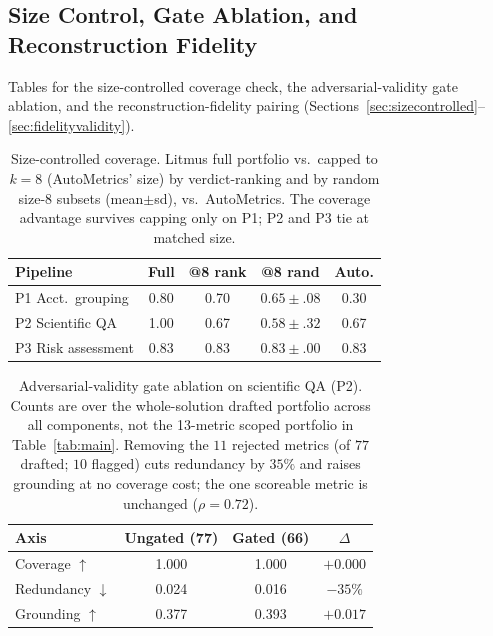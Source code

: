 \documentclass[11pt]{article}
\begin{document}
\subsection{Size Control, Gate Ablation, and Reconstruction Fidelity}
\label{app:robustness-tables}

Tables for the size-controlled coverage check, the adversarial-validity gate ablation, and the reconstruction-fidelity pairing (Sections~\ref{sec:sizecontrolled}--\ref{sec:fidelityvalidity}).

\begin{table}[t]
\centering
\small
\setlength{\tabcolsep}{4pt}
\begin{tabular}{lcccc}
\toprule
Pipeline & Full & @8 rank & @8 rand & Auto. \\
\midrule
P1 Acct.\ grouping & 0.80 & 0.70 & $0.65{\pm}.08$ & 0.30 \\
P2 Scientific QA & 1.00 & 0.67 & $0.58{\pm}.32$ & 0.67 \\
P3 Risk assessment & 0.83 & 0.83 & $0.83{\pm}.00$ & 0.83 \\
\bottomrule
\end{tabular}
\caption{Size-controlled coverage. Litmus full portfolio vs.\ capped to $k{=}8$ (AutoMetrics' size) by verdict-ranking and by random size-8 subsets (mean$\pm$sd), vs.\ AutoMetrics. The coverage advantage survives capping only on P1; P2 and P3 tie at matched size.}
\label{tab:sizecontrolled}
\end{table}

\begin{table}[t]
\centering
\small
\setlength{\tabcolsep}{6pt}
\begin{tabular}{lccc}
\toprule
Axis & Ungated (77) & Gated (66) & $\Delta$ \\
\midrule
Coverage $\uparrow$ & 1.000 & 1.000 & $+0.000$ \\
Redundancy $\downarrow$ & 0.024 & 0.016 & $-35\%$ \\
Grounding $\uparrow$ & 0.377 & 0.393 & $+0.017$ \\
\bottomrule
\end{tabular}
\caption{Adversarial-validity gate ablation on scientific QA (P2). Counts are over the whole-solution drafted portfolio across all components, not the 13-metric scoped portfolio in Table~\ref{tab:main}. Removing the $11$ rejected metrics (of $77$ drafted; $10$ flagged) cuts redundancy by $35\%$ and raises grounding at no coverage cost; the one scoreable metric is unchanged ($\rho=0.72$).}
\label{tab:gate}
\end{table}
\end{document}

